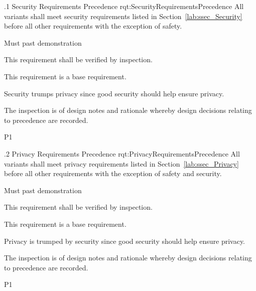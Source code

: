 \ONERQMTV
{\RqtNumberBase.1}
{Security Requirements Precedence}
{rqt:SecurityRequirementsPrecedence}
{All \ThisSystem variants shall meet security requirements listed in Section~\ref{lab:ssec_Security} before all other requirements with the exception of safety.}
{
	\item [Phase 1] Must past demonstration
}
{This requirement shall be verified by inspection.}
{
	\item [N/A] This requirement is a base requirement.
}
{
	\item Security trumps privacy since good security should help ensure privacy.
	\item The inspection is of design notes and rationale whereby design decisions relating to precedence are recorded.
}
{P1}

\ONERQMTV
{\RqtNumberBase.2}
{Privacy Requirements Precedence}
{rqt:PrivacyRequirementsPrecedence}
{All \ThisSystem variants shall meet privacy requirements listed in Section~\ref{lab:ssec_Privacy} before all other requirements with the exception of safety and security.}
{
	\item [Phase 1] Must past demonstration
}
{This requirement shall be verified by inspection.}
{
	\item [N/A] This requirement is a base requirement.
}
{
	\item Privacy is trumped by security since good security should help ensure privacy.
	\item The inspection is of design notes and rationale whereby design decisions relating to precedence are recorded.	
}
{P1}
